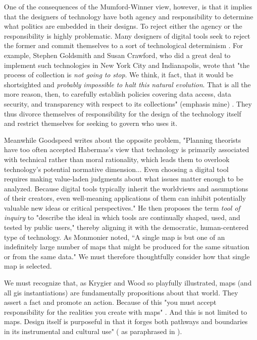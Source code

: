 One of the consequences of the Mumford-Winner view, however, is that it implies that the designers of technology have both agency and responsibility to determine what politics are embedded in their designs. To reject either the agency or the responsibility is highly problematic. Many designers of digital tools seek to reject the former and commit themselves to a sort of technological determinism \cite{sheppardGISSocietyResearch1995}. For example, Stephen Goldsmith and Susan Crawford, who did a great deal to implement such technologies in New York City and Indianapolis, wrote that "the process of collection is \textit{not going to stop}. We think, it fact, that it would be shortsighted and \textit{probably impossible to halt this natural evolution}. That is all the more reason, then, to carefully establish policies covering data access, data security, and transparency with respect to its collections" (emphasis mine) \cite{goldsmithResponsiveCityEngaging2014}. They thus divorce themselves of responsibility for the design of the technology itself and restrict themselves for seeking to govern who uses it.

Meanwhile Goodspeed writes about the opposite problem, "Planning theorists have too often accepted Habermas's view that technology is primarily associated with technical rather than moral rationality, which leads them to overlook technology's potential normative dimension... Even choosing a digital tool requires making value-laden judgments about what issues matter enough to be analyzed. Because digital tools typically inherit the worldviews and assumptions of their creators, even well-meaning applications of them can inhibit potentially valuable new ideas or critical perspectives." He then proposes the term \textit{tool of inquiry} to "describe the ideal in which tools are continually shaped, used, and tested by public users," \cite{goodspeedScenarioPlanningCities2020} thereby aligning it with the democratic, human-centered type of technology. As Monmonier noted, ``A single map is but one of an indefinitely large number of maps that might be produced for the same situation or from the same data." \cite{monmonierHowLieMaps1996} We must therefore thoughtfully consider how that single map is selected.

We must recognize that, as Krygier and Wood so playfully illustrated, maps (and all \ac{gis} instantiations) are fundamentally propositions about that world. They assert a fact and promote an action. Because of this "you must accept responsibility for the realities you create with maps" \cite{krygierCeEstPas2011}. And this is not limited to maps. Design itself is purposeful in that it forges both pathways and boundaries in its instrumental and cultural use" (\cite{paceyCultureTechnology1983} as paraphrased in \cite{nobleAlgorithmsOppressionHow2018}). 

